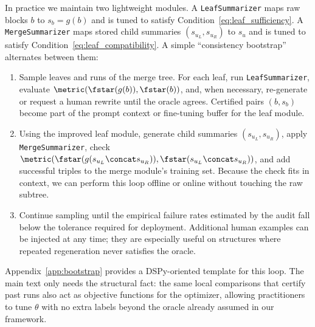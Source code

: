 In practice we maintain two lightweight modules. A \texttt{LeafSummarizer} maps raw blocks $b$ to $s_b = g(b)$ and is tuned to satisfy Condition~\eqref{eq:leaf_sufficiency}. A \texttt{MergeSummarizer} maps stored child summaries $(s_{u_L}, s_{u_R})$ to $s_u$ and is tuned to satisfy Condition~\eqref{eq:leaf_compatibility}. A simple ``consistency bootstrap'' alternates between them:
\begin{enumerate}[label=\roman*.]
    \item Sample leaves and runs of the merge tree. For each leaf, run \texttt{LeafSummarizer}, evaluate $\metric(\fstar(g(b)), \fstar(b))$, and, when necessary, re-generate or request a human rewrite until the oracle agrees. Certified pairs $(b, s_b)$ become part of the prompt context or fine-tuning buffer for the leaf module.
    \item Using the improved leaf module, generate child summaries $(s_{u_L}, s_{u_R})$, apply \texttt{MergeSummarizer}, check $\metric(\fstar(g(s_{u_L} \concat s_{u_R})), \fstar(s_{u_L} \concat s_{u_R}))$, and add successful triples to the merge module's training set. Because the check fits in context, we can perform this loop offline or online without touching the raw subtree.
    \item Continue sampling until the empirical failure rates estimated by the audit fall below the tolerance required for deployment. Additional human examples can be injected at any time; they are especially useful on structures where repeated regeneration never satisfies the oracle.
\end{enumerate}
Appendix~\ref{app:bootstrap} provides a DSPy-oriented template for this loop. The main text only needs the structural fact: the same local comparisons that certify past runs also act as objective functions for the optimizer, allowing practitioners to tune $\theta$ with no extra labels beyond the oracle already assumed in our framework.
